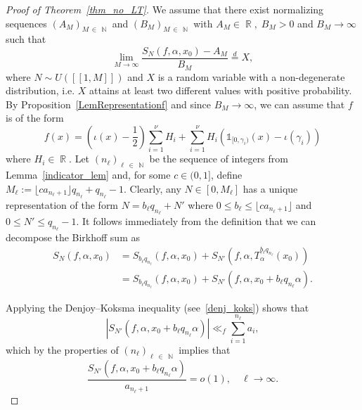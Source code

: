 \documentclass[10pt,a4paper]{amsart}
\numberwithin{equation}{section}
\DeclareMathOperator{\R}{\mathbb{R}}
\DeclareMathOperator{\N}{\mathbb{N}}
\newcommand{\kj}{n_{\ell}}
\theoremstyle{definition}
\begin{document}
\begin{proof}[Proof of Theorem~\ref{thm_no_LT}]
We assume that there exist normalizing sequences $(A_M)_{M\,\in\,\N}$ and $(B_M)_{M\,\in\,\N}$ with $A_M \in \R, \; B_M > 0$ and $ B_M \to \infty$ such that
\begin{equation}\label{LiminDist}
\lim_{M \rightarrow \infty} \frac{S_N(f, \alpha, x_0) - A_M}{B_M} \stackrel{d}{=} X,
\end{equation}
where $N \sim U([\![1,M]\!])$ and $X$ is a random variable with a non-degenerate distribution, i.e. $X$ attains at least two different values with positive probability. By Proposition~\ref{LemRepresentationf} and since $B_M \to \infty$, we can assume that $f$ is of the form
\[
f(x) = \left (\iota(x) - \frac{1}{2} \right) \sum_{i=1}^{\nu} H_i + \sum_{i=1}^{\nu}H_i \left(\mathds{1}_{[0, \gamma_i)}(x) -\iota(\gamma_i) \right)
\]
where $H_i \in \R$. Let $(n_\ell)_{\ell\,\in\,\N}$ be the sequence of integers from Lemma~\ref{indicator_lem} and, for some $c \in (0,1]$, define $M_{\ell} := \lfloor ca_{n_{\ell} +1} \rfloor q_{n_{\ell}} + q_{\kj}-1$. Clearly, any $N \in [0,M_{\ell}]$ has a unique representation of the form $N = b_{\ell}q_{n_{\ell}} +N' $ where $0 \leq b_{\ell} \leq \lfloor ca_{n_{\ell}+1}\rfloor $ and $0 \leq N' \leq q_{n_{\ell}}-1$. It follows immediately from the definition that we can decompose the Birkhoff sum as
\begin{align*}
S_N(f,\alpha,x_0) &= S_{b_{\ell}q_{n_\ell}}(f,\alpha,x_0) +S_{N'}\left(f, \alpha, T_{\alpha}^{b_\ell q_{n_{\ell}}}(x_0)\right)
\\&= S_{b_{\ell}q_{n_\ell}}(f,\alpha,x_0) + S_{N'}(f, \alpha, x_0 + b_\ell q_{n_{\ell}} \alpha).
\end{align*}

Applying the Denjoy--Koksma inequality (see~\eqref{denj_koks}) shows that
\begin{equation*}
\left| S_{N'}(f, \alpha, x_0 + b_\ell q_{n_{\ell}} \alpha)\right|
\ll_f \sum_{i = 1}^{n_{\ell}} a_i,
\end{equation*}
which by the properties of $(\kj)_{\ell \,\in\,\N}$ implies that
\begin{equation}\label{Eq_Error_est}
\frac{S_{N'}(f, \alpha, x_0 + b_\ell q_{n_{\ell}} \alpha) }{a_{\kj +1}} = o(1), \quad \ell \to \infty.
\end{equation}


\end{proof}
\end{document}

